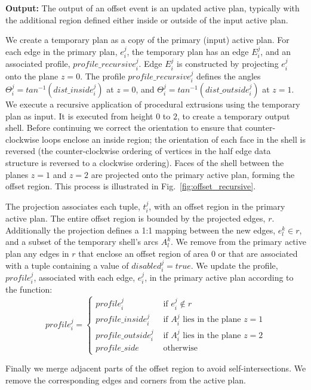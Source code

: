 {\bf Output:} The output of an offset event is an updated active plan, typically with the additional region defined either inside or outside of the input active plan.

We create a temporary plan as a copy of the primary (input) active plan. For each edge in the primary plan, $e^j_i$, the temporary plan has an edge $E^j_i$, and an associated profile, $profile\_recursive^j_i$. Edge $E^j_i$ is constructed by projecting $e^j_i$ onto the plane $z = 0$. The profile $profile\_recursive^j_i$ defines the angles $\Theta^j_i = tan^{-1}(dist\_inside^j_i)$ at $z = 0$, and $\Theta^j_i = tan^{-1}(dist\_outside^j_i)$ at $z = 1$. We execute a recursive application of procedural extrusions using the temporary plan as input. It is executed from height $0$ to $2$, to create a temporary output shell.
 Before continuing we correct the orientation to ensure that counter-clockwise loops enclose an inside region; the orientation of each face in the shell is reversed (the counter-clockwise ordering of vertices in the half edge data structure is reversed to a clockwise ordering). 
Faces of the shell between the planes $z = 1$ and $z = 2$ are projected onto the primary active plan, forming the offset region. This process is illustrated in Fig.~\ref{fig:offset_recursive}. 

The projection associates each tuple, $t^j_i$, with an offset region in the primary active plan. The entire offset region is bounded by the projected edges, $r$. Additionally the projection defines a 1:1 mapping between the new edges, $e^k_l \in r$, and a subset of the temporary shell's arcs $A^k_l$.
We remove from the primary active plan any edges in $r$ that enclose an offset region of area $0$ or that are associated with a tuple containing a value of $disabled^j_i = true$. We update the profile, $profile^j_i$, associated with each edge, $e^j_i$, in the primary active plan according to the function: $$ profile^j_i = \left\{ \begin{array}{rl}
 profile^j_i &\mbox{ if $e_i^j \notin r$ } \\
 profile\_inside^j_i &\mbox{ if $A^j_i$ lies in the plane $z = 1$} \\
 profile\_outside^j_i &\mbox{ if $A^j_i$ lies in the plane $z = 2$} \\
 profile\_side &\mbox{ otherwise }
       \end{array} \right.$$

Finally we merge adjacent parts of the offset region to avoid self-intersections. We remove the corresponding edges and corners from the active plan.

